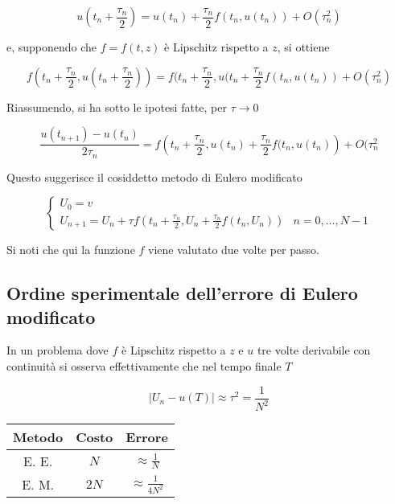 \documentclass[hidelinks, 10pt]{report}
\begin{document}
\[ u \left( t_{n} + \frac{\tau_{n}}{2} \right) = u(t_{n}) + \frac{\tau_{n}}{2} f(t_{n}, u(t_{n})) + O(\tau_{n}^{2}) \]

e, supponendo che $ f = f(t, z) $ \`e Lipschitz rispetto a $ z $, si ottiene

\[ f \left( t_{n} + \frac{\tau_{n}}{2}, u \left(t_{n} + \frac{\tau_{n}}{2} \right) \right) = f(t_{n} + \frac{\tau_{n}}{2}, u(t_{n} + \frac{\tau_{n}}{2} f(t_{n}, u(t_{n}) ) + O(\tau_{n}^{2})  \]

Riassumendo, si ha sotto le ipotesi fatte, per $ \tau \to 0 $

\[ \frac{u(t_{n + 1}) - u(t_{n})}{2 \tau_{n}} = f \left( t_{n} + \frac{\tau_{n}}{2}, u(t_{n}) + \frac{\tau_{n}}{2} f(t_{n}, u(t_{n}) \right) + O(\tau_{n}^{2} \]

Questo suggerisce il cosiddetto metodo di Eulero modificato

\[
\begin{cases}
U_{0} = v \\
U_{n + 1} = U_{n} + \tau f \left( t_{n} + \frac{\tau_{n}}{2}, U_{n} + \frac{\tau_{n}}{2} f(t_{n}, U_{n}) \right)	 & n = 0, \dotsc, N - 1
\end{cases}
\]

Si noti che qui la funzione $ f $ viene valutato due volte per passo. 

\subsection{Ordine sperimentale dell'errore di Eulero modificato}
In un problema dove $ f $ \`e Lipschitz rispetto a  $ z $ e $ u $ tre volte derivabile con continuit\`a si osserva effettivamente che nel tempo finale $ T $

\[ \vert U_{n} - u(T) \vert \approx \tau^{2} = \frac{1}{N^{2}} \]

\begin{center}
\begin{tabular}{c|c|c}
	Metodo & Costo & Errore \\
\hline
	E. E. & $ N $ & $ \approx \frac{1}{N} $ \\
\hline
	E. M. & $ 2N $ & $ \approx \frac{1}{4N^{2}} $ \\
\end{tabular}
\end{center}

\end{document}
